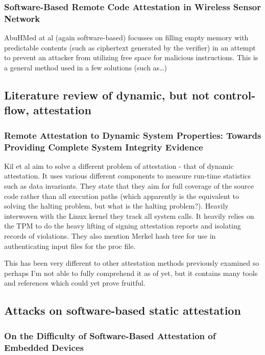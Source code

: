 \subsubsection{Software-Based Remote Code Attestation in Wireless Sensor Network}

AbuHMed at al \cite{AbuHmed2009} (again software-based) focusses on filling empty memory with predictable contents (such as ciphertext generated by the verifier) in an attempt to prevent an attacker from utilizing free space for malicious instructions. This is a general method used in a few solutions (such as…)

\subsection{Literature review of dynamic, but not control-flow, attestation}

\subsubsection{Remote Attestation to Dynamic System Properties: Towards Providing Complete System Integrity Evidence}

Kil et al \cite{Kil2009} aim to solve a different problem of attestation - that of dynamic attestation. It uses various different components to measure run-time statistics such as data invariants. They state that they aim for full coverage of the source code rather than all execution paths (which apparently is the equivalent to solving the halting problem, but what is the halting problem?). Heavily interwoven with the Linux kernel they track all system calls. It heavily relies on the TPM to do the heavy lifting of signing attestation reports and isolating records of violations. They also mention Merkel hash tree for use in authenticating input files for the proc file.

This has been very different to other attestation methods previously examined so perhaps I’m not able to fully comprehend it as of yet, but it contains many tools and references which could yet prove fruitful.

\subsection{Attacks on software-based static attestation}

\subsubsection{On the Difficulty of Software-Based Attestation of Embedded Devices}

